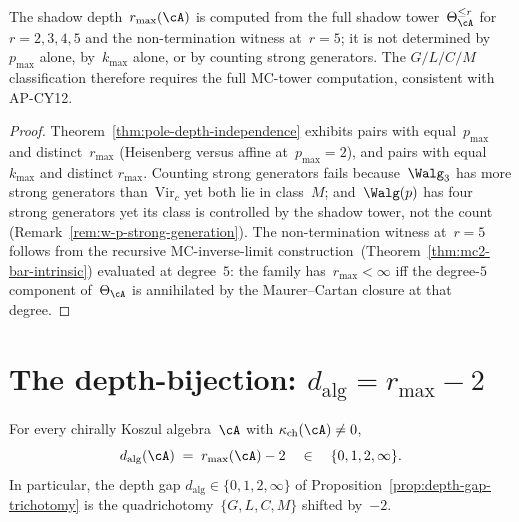\begin{proposition}
\label{prop:class-from-full-tower}
\ClaimStatusConditional
The shadow depth~$r_{\max}(\cA)$ is computed from the full shadow
tower~$\Theta_\cA^{\leq r}$ for~$r = 2, 3, 4, 5$ and the
non-termination witness at~$r = 5$; it is not determined by~$p_{\max}$
alone, by~$k_{\max}$ alone, or by counting strong generators. The
$G/L/C/M$ classification therefore requires the full MC-tower
computation, consistent with AP-CY\textup{12}.
\end{proposition}

\begin{proof}
Theorem~\ref{thm:pole-depth-independence} exhibits pairs with
equal~$p_{\max}$ and distinct~$r_{\max}$ (Heisenberg versus affine
at~$p_{\max} = 2$), and pairs with equal~$k_{\max}$ and distinct
$r_{\max}$. Counting strong generators fails because~$\Walg_3$ has
more strong generators than~$\mathrm{Vir}_c$ yet both lie in
class~$M$; and~$\Walg(p)$ has four strong generators yet its
class is controlled by the shadow tower, not the count
\textup{(}Remark~\ref{rem:w-p-strong-generation}\textup{)}. The
non-termination witness at~$r = 5$ follows from the recursive
MC-inverse-limit construction~(Theorem~\ref{thm:mc2-bar-intrinsic})
evaluated at degree~$5$: the family has~$r_{\max}<\infty$ iff the
degree-$5$ component of~$\Theta_\cA$ is annihilated by the
Maurer--Cartan closure at that degree.
\end{proof}

\section{The depth-bijection: $d_{\mathrm{alg}} = r_{\max} - 2$}
\label{sec:d-alg-r-max-bijection}

\begin{theorem}
\label{thm:d-alg-r-max-bijection}
\ClaimStatusConditional
For every chirally Koszul algebra~$\cA$ with $\kappa_{\mathrm{ch}}(\cA)\neq 0$,
\begin{equation}\label{eq:d-alg-r-max}
d_{\mathrm{alg}}(\cA) \;=\; r_{\max}(\cA) - 2
\quad\in\quad \{0, 1, 2, \infty\}.
\end{equation}
In particular, the depth gap $d_{\mathrm{alg}}\in\{0,1,2,\infty\}$
of Proposition~\ref{prop:depth-gap-trichotomy} is the
quadrichotomy~$\{G,L,C,M\}$ shifted by~$-2$.
\end{theorem}

